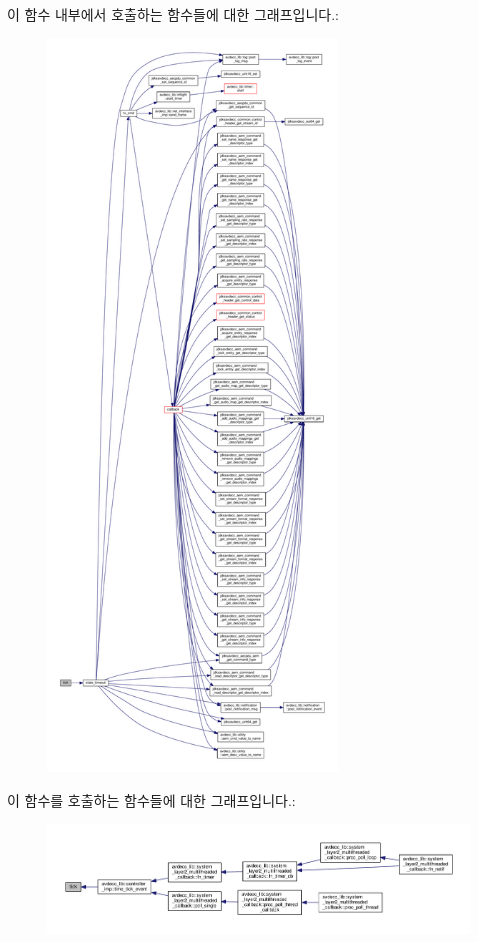 이 함수 내부에서 호출하는 함수들에 대한 그래프입니다.\+:
\nopagebreak
\begin{figure}[H]
\begin{center}
\leavevmode
\includegraphics[height=550pt]{classavdecc__lib_1_1aecp__controller__state__machine_a873dd91783f9efb4a590aded1f70d6b0_cgraph}
\end{center}
\end{figure}




이 함수를 호출하는 함수들에 대한 그래프입니다.\+:
\nopagebreak
\begin{figure}[H]
\begin{center}
\leavevmode
\includegraphics[width=350pt]{classavdecc__lib_1_1aecp__controller__state__machine_a873dd91783f9efb4a590aded1f70d6b0_icgraph}
\end{center}
\end{figure}


